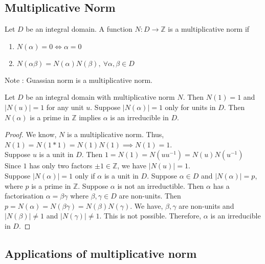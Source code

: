 \subsection{Multiplicative Norm}
\begin{definition}
	Let $D$ be an integral domain. A function $N : D \to \mathbb{Z}$ is a multiplicative norm if 
	\begin{enumerate}
		\item $N(\alpha) = 0 \iff \alpha = 0$
		\item $N(\alpha\beta) = N(\alpha)N(\beta),\ \forall \alpha,\beta \in D$
	\end{enumerate}
\end{definition}
Note : Guassian norm is a multiplicative norm.

\begin{theorem}
	Let $D$ be an integral domain with multiplicative norm $N$.
	Then $N(1) = 1$ and $|N(u)| = 1$ for any unit $u$.
	Suppose $|N(\alpha)| = 1$ only for units  in $D$.
	Then $N(\alpha)$ is a prime in $\mathbb{Z}$ implies $\alpha$ is an irreducible in $D$.
\end{theorem}
\begin{proof}
	We know, $N$ is a multiplicative norm.
	Thus, $N(1) = N(1 \ast 1) = N(1)N(1) \implies N(1) = 1$.\\

	Suppose $u$ is a unit in $D$.
	Then $1 = N(1) = N(uu^{-1}) = N(u) N(u^{-1})$
	Since $1$ has only two factors $\pm 1 \in \mathbb{Z}$, we have $|N(u)| = 1$.\\

	Suppose $|N(\alpha)| = 1$ only if $\alpha$ is a unit in $D$.
	Suppose $\alpha \in D$ and $|N(\alpha)| = p$, where $p$ is a prime in $\mathbb{Z}$.
	Suppose $\alpha$ is not an irreductible.
	Then $\alpha$ has a factorisation $\alpha = \beta\gamma$ where $\beta,\gamma \in D$ are non-units.
	Then $p = N(\alpha) = N(\beta\gamma) = N(\beta)N(\gamma)$.
	We have, $\beta,\gamma$ are non-units and $|N(\beta)| \ne 1$ and $|N(\gamma)| \ne 1$.
	This is not possible.
	Therefore, $\alpha$ is an irreducible in $D$.
\end{proof}

\subsection{Applications of multiplicative norm}
